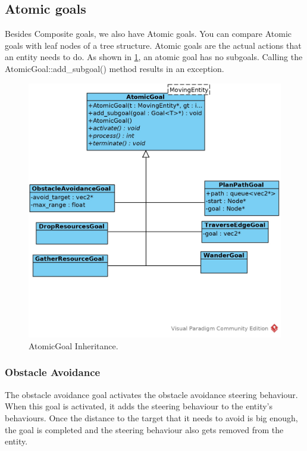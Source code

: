 \subsection{Atomic goals}
Besides Composite goals, we also have Atomic goals. You can compare Atomic 
goals with leaf nodes of a tree structure. Atomic goals are the actual actions
 that an entity needs to do. As shown in \cref{fig:atomicgoal-inherit}, an atomic 
 goal has no subgoals. Calling the AtomicGoal::add\_subgoal() method results in an 
 exception.
 
 \begin{figure}[!htb]
    \centering
    \includegraphics{res/AtomicGoal-Inherit.jpg}
    \caption{AtomicGoal Inheritance.}\label{fig:atomicgoal-inherit}
\end{figure}

\subsubsection{Obstacle Avoidance}
The obstacle avoidance goal activates the obstacle avoidance steering 
behaviour. When this goal is activated, it adds the steering behaviour to the 
entity's behaviours. Once the distance to the target that it needs to avoid 
is big enough, the goal is completed and the steering behaviour also gets 
removed from the entity.

